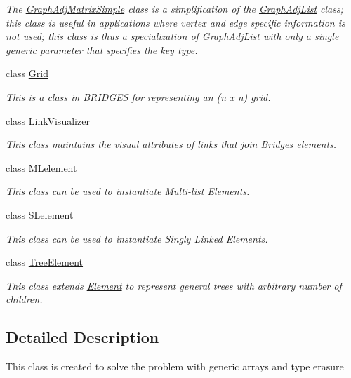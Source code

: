 \begin{DoxyCompactItemize}
\begin{DoxyCompactList}\small\item\em The \mbox{\hyperlink{classbridges_1_1base_1_1_graph_adj_matrix_simple}{Graph\+Adj\+Matrix\+Simple}} class is a simplification of the \mbox{\hyperlink{classbridges_1_1base_1_1_graph_adj_list}{Graph\+Adj\+List}} class; this class is useful in applications where vertex and edge specific information is not used; this class is thus a specialization of \mbox{\hyperlink{classbridges_1_1base_1_1_graph_adj_list}{Graph\+Adj\+List}} with only a single generic parameter that specifies the key type. \end{DoxyCompactList}\item 
class \mbox{\hyperlink{classbridges_1_1base_1_1_grid}{Grid}}
\begin{DoxyCompactList}\small\item\em This is a class in B\+R\+I\+D\+G\+ES for representing an (n x n) grid. \end{DoxyCompactList}\item 
class \mbox{\hyperlink{classbridges_1_1base_1_1_link_visualizer}{Link\+Visualizer}}
\begin{DoxyCompactList}\small\item\em This class maintains the visual attributes of links that join Bridges elements. \end{DoxyCompactList}\item 
class \mbox{\hyperlink{classbridges_1_1base_1_1_m_lelement}{M\+Lelement}}
\begin{DoxyCompactList}\small\item\em This class can be used to instantiate Multi-\/list Elements. \end{DoxyCompactList}\item 
class \mbox{\hyperlink{classbridges_1_1base_1_1_s_lelement}{S\+Lelement}}
\begin{DoxyCompactList}\small\item\em This class can be used to instantiate Singly Linked Elements. \end{DoxyCompactList}\item 
class \mbox{\hyperlink{classbridges_1_1base_1_1_tree_element}{Tree\+Element}}
\begin{DoxyCompactList}\small\item\em This class extends \mbox{\hyperlink{classbridges_1_1base_1_1_element}{Element}} to represent general trees with arbitrary number of children. \end{DoxyCompactList}\end{DoxyCompactItemize}


\subsection{Detailed Description}
This class is created to solve the problem with generic arrays and type erasure 